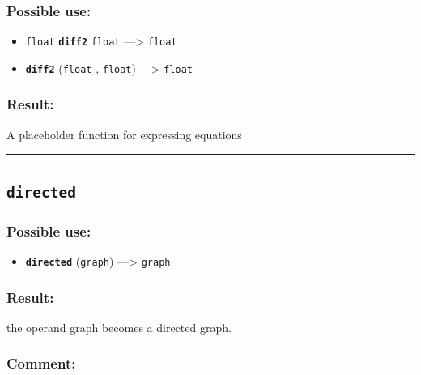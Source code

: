 \documentclass[]{book}
\providecommand{\tightlist}{%
  \setlength{\itemsep}{0pt}\setlength{\parskip}{0pt}}
\theoremstyle{definition}
\theoremstyle{definition}
\theoremstyle{definition}
\theoremstyle{remark}
\begin{document}
\subsubsection{Possible use:}\label{possible-use-131}

\begin{itemize}
\tightlist
\item
  \texttt{float} \textbf{\texttt{diff2}} \texttt{float}
  ---\textgreater{} \texttt{float}
\item
  \textbf{\texttt{diff2}} (\texttt{float} , \texttt{float})
  ---\textgreater{} \texttt{float}
\end{itemize}

\subsubsection{Result:}\label{result-127}

A placeholder function for expressing equations

\begin{center}\rule{0.5\linewidth}{\linethickness}\end{center}

\subsection{\texorpdfstring{\texttt{directed}}{directed}}\label{directed}

\subsubsection{Possible use:}\label{possible-use-132}

\begin{itemize}
\tightlist
\item
  \textbf{\texttt{directed}} (\texttt{graph}) ---\textgreater{}
  \texttt{graph}
\end{itemize}

\subsubsection{Result:}\label{result-128}

the operand graph becomes a directed graph.

\subsubsection{Comment:}\label{comment-30}
\end{document}
